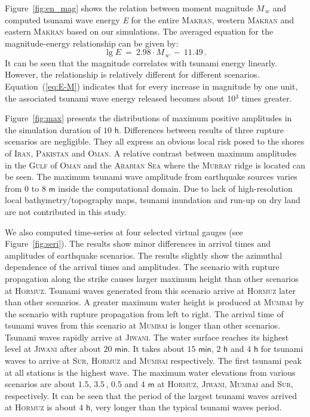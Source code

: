 \documentclass[12pt]{llncs}
\begin{document}
Figure~\ref{fig:en_mag} shows the relation between moment magnitude $M_{\,w}$ and computed tsunami wave energy \textit{E} for the entire \textsc{Makran}, western \textsc{Makran} and eastern \textsc{Makran} based on our simulations. The averaged equation for the magnitude-energy relationship can be given by:
%
%
\begin{equation}\label{eq:E-M}
\lg E\ =\ 2.98\cdot M_{\,w}\ -\ 11.49\,.
\end{equation}
%
%
It can be seen that the magnitude correlates with tsunami energy linearly. However, the relationship is relatively different for different scenarios. Equation~(\ref{eq:E-M}) indicates that for every increase in magnitude by one unit, the associated tsunami wave energy released becomes about 10$^{3}$ times greater.

Figure~\ref{fig:max} presents the distributions of maximum positive amplitudes in the simulation duration of $10$ $\mathsf{h}$. Differences between results of three rupture scenarios are negligible. They all express an obvious local risk posed to the shores of \textsc{Iran}, \textsc{Pakistan} and \textsc{Oman}. A relative contrast between maximum amplitudes in the \textsc{Gulf} of \textsc{Oman} and the \textsc{Arabian} \textsc{Sea} where the \textsc{Murray} ridge is located can be seen. The maximum tsunami wave amplitude from earthquake sources varies from $0$ to $8$ $\mathsf{m}$ inside the computational domain. Due to lack of high-resolution local bathymetry/topography maps, tsunami inundation and run-up on dry land are not contributed in this study.

We also computed time-series at four selected virtual gauges (see Figure~\ref{fig:seri}). The results show minor differences in arrival times and amplitudes of earthquake scenarios. The results slightly show the azimuthal dependence of the arrival times and amplitudes. The scenario with rupture propagation along the strike causes larger maximum height than other scenarios at \textsc{Hormuz}. Tsunami waves generated from this scenario arrive at \textsc{Hormuz} later than other scenarios. A greater maximum water height is produced at \textsc{Mumbai} by the scenario with rupture propagation from left to right. The arrival time of tsunami waves from this scenario at \textsc{Mumbai} is longer than other scenarios. Tsunami waves rapidly arrive at \textsc{Jiwani}. The water surface reaches its highest level at \textsc{Jiwani} after about $20$ $\mathsf{min}$. It takes about $15$ $\mathsf{min}$, $2$ $\mathsf{h}$ and $4$ $\mathsf{h}$ for tsunami waves to arrive at \textsc{Sur}, \textsc{Hormuz} and \textsc{Mumbai} respectively. The first tsunami peak at all stations is the highest wave. The maximum water elevations from various scenarios are about $1.5$, $3.5\,$, $0.5$ and $4$ $\mathsf{m}$ at \textsc{Hormuz}, \textsc{Jiwani}, \textsc{Mumbai} and \textsc{Sur}, respectively. It can be seen that the period of the largest tsunami waves arrived at \textsc{Hormuz} is about $4$ $\mathsf{h}$, very longer than the typical tsunami waves period. 
%
%
\end{document}
